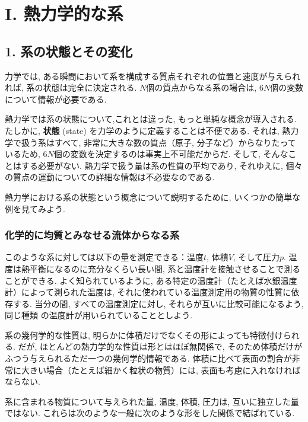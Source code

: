 
\chapter*{I. 熱力学的な系}
\section*{1. 系の状態とその変化}
力学では, ある瞬間において系を構成する質点それぞれの位置と速度が与えられれば, 系の状態は完全に決定される. $N$個の質点からなる系の場合は, $6N$個の変数について情報が必要である.\par
熱力学では系の状態について,これとは違った, もっと単純な概念が導入される. たしかに, \textbf{状態} (state) を力学のように定義することは不便である. それは, 熱力学で扱う系はすべて, 非常に大きな数の質点（原子, 分子など）からなりたっているため, $6N$個の変数を決定するのは事実上不可能だからだ. そして, そんなことはする必要がない. 熱力学で扱う量は系の性質の平均であり, それゆえに, 個々の質点の運動についての詳細な情報は不必要なのである.\par
熱力学における系の状態という概念について説明するために, いくつかの簡単な例を見てみよう.\par

\subsection*{化学的に均質とみなせる流体からなる系}
このような系に対しては以下の量を測定できる：温度$t$, 体積$V$, そして圧力$p$. 温度は熱平衡になるのに充分なくらい長い間, 系と温度計を接触させることで測ることができる. よく知られているように, ある特定の温度計（たとえば水銀温度計）によって測られた温度は, それに使われている温度測定用の物質の性質に依存する. 当分の間, すべての温度測定に対し, それらが互いに比較可能になるよう, 同じ種類
の温度計が用いられていることとしよう.\par
系の幾何学的な性質は, 明らかに体積だけでなくその形によっても特徴付けられる. だが, ほとんどの熱力学的な性質は形とはほぼ無関係で, そのため体積だけがふつう与えられるただ一つの幾何学的情報である. 体積に比べて表面の割合が非常に大きい場合（たとえば細かく粒状の物質）には, 表面も考慮に入れなければならない.\par
系に含まれる物質について与えられた量, 温度, 体積, 圧力は, 互いに独立した量ではない. これらは次のような一般に次のような形をした関係で結ばれている.

